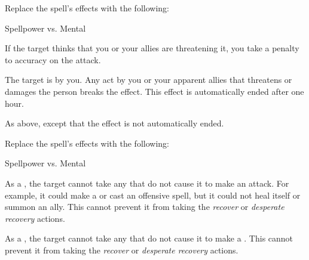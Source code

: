 Replace the spell's effects with the following:
\begin{spellcontent}

\begin{augmenteffects}




\begin{spellattack}{Spellpower vs. Mental}


\spellspecial If the target thinks that you or your allies are threatening it, you take a  penalty to accuracy on the attack.


\hit
The target is \charmed by you.
Any act by you or your apparent allies that threatens or damages the  person breaks the effect.
This effect is automatically ended after one hour.



\crit
As above, except that the effect is not automatically ended.



\end{spellattack}





\end{augmenteffects}

\end{spellcontent}








Replace the spell's effects with the following:
\begin{spellcontent}

\begin{augmenteffects}




\begin{spellattack}{Spellpower vs. Mental}


\hit
As a , the target cannot take any  that do not cause it to make an attack.
For example, it could make a  or cast an offensive spell, but it could not heal itself or summon an ally.
This cannot prevent it from taking the \textit{recover} or \textit{desperate recovery} actions.



\crit
As a , the target cannot take any  that do not cause it to make a .
This cannot prevent it from taking the \textit{recover} or \textit{desperate recovery} actions.



\end{spellattack}





\end{augmenteffects}

\end{spellcontent}





